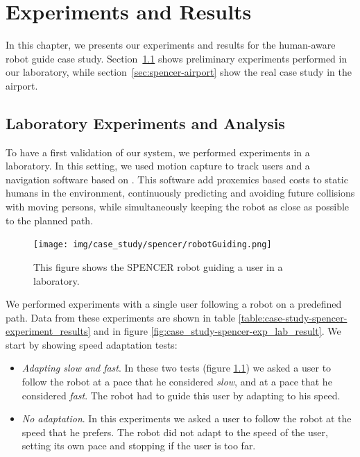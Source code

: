 \chapter{Experiments and Results} %

\label{chapter:spencer_results} %



In this chapter, we presents our experiments and results for the human-aware robot guide case study. Section~\ref{sec:spencer-lab_experiments} shows preliminary experiments performed in our laboratory, while section~\ref{sec:spencer-airport} show the real case study in the airport.


\section{Laboratory Experiments and Analysis}
\label{sec:spencer-lab_experiments}

To have a first validation of our system, we performed experiments in a laboratory. In this setting, we used motion capture to track users and a navigation software based on \cite{sisbotTRO2007,kruse12crossing}. This software add proxemics based costs to static humans in the environment, continuously predicting and avoiding future collisions with moving persons, while  simultaneously keeping the robot as close as possible to the planned path.

\begin{figure}[ht!]
	\centering
	\texttt{[image: img/case\_study/spencer/robotGuiding.png]}
	\caption[Guiding a user in the laboratory]{This figure shows the SPENCER robot guiding a user in a laboratory.}
	\label{fig:case_study-spencer-robotGuiding}
\end{figure}

We performed experiments with a single user following a robot on a predefined path. Data from these experiments are shown in table \ref{table:case-study-spencer-experiment_results} and in figure \ref{fig:case_study-spencer-exp_lab_result}. We start by showing speed adaptation tests:
\begin{itemize}
\item \textit{Adapting slow and fast}. In these two tests (figure \ref{fig:case_study-spencer-robotGuiding}) we asked a user to follow the robot at a pace that he considered \textit{slow}, and at a pace that he considered \textit{fast}. The robot had to guide this user by adapting to his speed.  
\item \textit{No adaptation}. In this experiments we asked a user to follow the robot at the speed that he prefers. The robot did not adapt to the speed of the user, setting its own pace and stopping if the user is too far.
\end{itemize}

